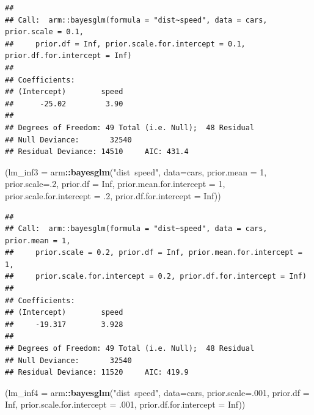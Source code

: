 \documentclass[]{article}
\newenvironment{Shaded}{\begin{snugshade}}{\end{snugshade}}
\newcommand{\KeywordTok}[1]{\textcolor[rgb]{0.13,0.29,0.53}{\textbf{#1}}}
\newcommand{\DataTypeTok}[1]{\textcolor[rgb]{0.13,0.29,0.53}{#1}}
\newcommand{\DecValTok}[1]{\textcolor[rgb]{0.00,0.00,0.81}{#1}}
\newcommand{\StringTok}[1]{\textcolor[rgb]{0.31,0.60,0.02}{#1}}
\newcommand{\OtherTok}[1]{\textcolor[rgb]{0.56,0.35,0.01}{#1}}
\newcommand{\OperatorTok}[1]{\textcolor[rgb]{0.81,0.36,0.00}{\textbf{#1}}}
\newcommand{\NormalTok}[1]{#1}
\begin{document}
\begin{verbatim}
## 
## Call:  arm::bayesglm(formula = "dist~speed", data = cars, prior.scale = 0.1, 
##     prior.df = Inf, prior.scale.for.intercept = 0.1, prior.df.for.intercept = Inf)
## 
## Coefficients:
## (Intercept)        speed  
##      -25.02         3.90  
## 
## Degrees of Freedom: 49 Total (i.e. Null);  48 Residual
## Null Deviance:       32540 
## Residual Deviance: 14510     AIC: 431.4
\end{verbatim}

\begin{Shaded}
\begin{Highlighting}[]
\NormalTok{(}\DataTypeTok{lm_inf3 =}\NormalTok{ arm}\OperatorTok{::}\KeywordTok{bayesglm}\NormalTok{(}\StringTok{"dist~speed"}\NormalTok{, }\DataTypeTok{data=}\NormalTok{cars, }\DataTypeTok{prior.mean =} \DecValTok{1}\NormalTok{, }\DataTypeTok{prior.scale=}\NormalTok{.}\DecValTok{2}\NormalTok{, }\DataTypeTok{prior.df =} \OtherTok{Inf}\NormalTok{, }\DataTypeTok{prior.mean.for.intercept =} \DecValTok{1}\NormalTok{, }\DataTypeTok{prior.scale.for.intercept =}\NormalTok{ .}\DecValTok{2}\NormalTok{, }\DataTypeTok{prior.df.for.intercept =} \OtherTok{Inf}\NormalTok{))}
\end{Highlighting}
\end{Shaded}

\begin{verbatim}
## 
## Call:  arm::bayesglm(formula = "dist~speed", data = cars, prior.mean = 1, 
##     prior.scale = 0.2, prior.df = Inf, prior.mean.for.intercept = 1, 
##     prior.scale.for.intercept = 0.2, prior.df.for.intercept = Inf)
## 
## Coefficients:
## (Intercept)        speed  
##     -19.317        3.928  
## 
## Degrees of Freedom: 49 Total (i.e. Null);  48 Residual
## Null Deviance:       32540 
## Residual Deviance: 11520     AIC: 419.9
\end{verbatim}

\begin{Shaded}
\begin{Highlighting}[]
\NormalTok{(}\DataTypeTok{lm_inf4 =}\NormalTok{ arm}\OperatorTok{::}\KeywordTok{bayesglm}\NormalTok{(}\StringTok{"dist~speed"}\NormalTok{, }\DataTypeTok{data=}\NormalTok{cars, }\DataTypeTok{prior.scale=}\NormalTok{.}\DecValTok{001}\NormalTok{, }\DataTypeTok{prior.df =} \OtherTok{Inf}\NormalTok{, }\DataTypeTok{prior.scale.for.intercept =}\NormalTok{ .}\DecValTok{001}\NormalTok{, }\DataTypeTok{prior.df.for.intercept =} \OtherTok{Inf}\NormalTok{))}
\end{Highlighting}
\end{Shaded}
\end{document}
